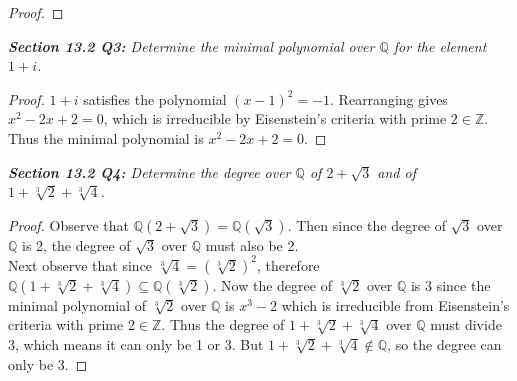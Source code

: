 \documentclass{article}
\begin{document}
\begin{enumerate}[label={(\alph*)}]
\begin{proof}
      \end{proof}
  \end{enumerate}

\it \textbf{Section 13.2 Q3:} Determine the minimal polynomial over
  $\mathbb{Q}$ for the element $1+i$.

  \begin{proof}
    $1+i$ satisfies the polynomial $(x-1)^2=-1$. Rearranging gives
    $x^2-2x+2=0$, which is irreducible by Eisenstein's criteria with prime
    $2\in\mathbb{Z}$. Thus the minimal polynomial is $x^2-2x+2=0$.
  \end{proof}

\it \textbf{Section 13.2 Q4:} Determine the degree over $\mathbb{Q}$ of
  $2+\sqrt{3}$ and of $1+\sqrt[3]{2}+\sqrt[3]{4}$.

  \begin{proof}
    Observe that $\mathbb{Q}(2+\sqrt{3}) =\mathbb{Q}(\sqrt{3})$. Then since
    the degree of $\sqrt{3}$ over $\mathbb{Q}$ is 2, the degree of
    $\sqrt{3}$ over $\mathbb{Q}$ must also be 2. \\

    Next observe that since $\sqrt[3]{4}=(\sqrt[3]{2})^2$, therefore
    $\mathbb{Q}(1+\sqrt[3]{2}+\sqrt[3]{4})\subseteq
    \mathbb{Q}(\sqrt[3]{2})$. Now the degree of $\sqrt[3]{2}$ over
    $\mathbb{Q}$ is 3 since the minimal polynomial of $\sqrt[3]{2}$ over
    $\mathbb{Q}$ is $x^3-2$ which is irreducible from Eisenstein's criteria
    with prime $2\in\mathbb{Z}$. Thus the degree of
    $1+\sqrt[3]{2}+\sqrt[3]{4}$ over $\mathbb{Q}$ must divide 3, which
    means it can only be 1 or 3. But
    $1+\sqrt[3]{2}+\sqrt[3]{4}\not\in\mathbb{Q}$, so the degree can only be
    3.
  \end{proof}
\end{document}
